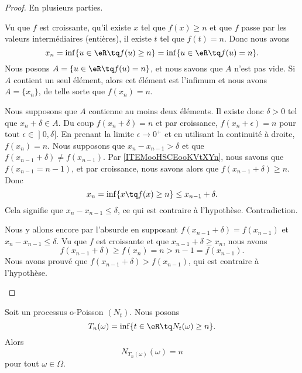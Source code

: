 \begin{proof}
	En plusieurs parties.
	\begin{subproof}
		\spitem[\( f(x_n)=n\)]
		Vu que \( f\) est croissante, qu'il existe \( x\) tel que \( f(x)\geq n\) et que \( f\) passe par les valeurs intermédiaires (entières), il existe \( t\) tel que \( f(t)=n\). Donc nous avons
		\begin{equation}
			x_n=\inf\{ u\in \eR\tq f(u)\geq n \}=\inf\{ u\in \eR\tq f(u)=n \}.
		\end{equation}
		Nous posons \( A=\{ u\in \eR\tq f(u)=n \}\), et nous savons que \( A\) n'est pas vide. Si \( A\) contient un seul élément, alors cet élément est l'infimum et nous avons \( A=\{ x_n \}\), de telle sorte que \( f(x_n)=n\).

		Nous supposons que \( A\) contienne au moins deux éléments. Il existe donc \( \delta>0\) tel que \( x_n+\delta\in A\). Du coup \( f(x_n+\delta)=n\) et par croissance, \( f(x_n+\epsilon)=n\) pour tout \( \epsilon\in \mathopen] 0,\delta\mathclose]\). En prenant la limite \( \epsilon\to 0^+\) et en utilisant la continuité à droite, \( f(x_n)=n\).
		\spitem[\( \Rightarrow\)]
		Nous supposons que \( x_n-x_{n-1}>\delta\) et que \( f(x_{n-1}+\delta)\neq f(x_{n-1})\). Par \ref{ITEMooHSCEooKVtXYn}, nous savons que \( f(x_{n-1}=n-1)\), et par croissance, nous savons alors que \( f(x_{n-1}+\delta)\geq n\). Donc
		\begin{equation}
			x_n=\inf\{ x\tq f(x)\geq n \}\leq x_{n-1}+\delta.
		\end{equation}
		Cela signifie que \( x_n-x_{n-1}\leq \delta\), ce qui est contraire à l'hypothèse. Contradiction.

		\spitem[\( \Leftarrow\)]
		Nous y allons encore par l'absurde en supposant \( f(x_{n-1}+\delta)=f(x_{n-1})\) et \( x_n-x_{n-1}\leq \delta\). Vu que \( f\) est croissante et que \( x_{n-1}+\delta\geq x_n\), nous avons
		\begin{equation}
			f(x_{n-1}+\delta)\geq f(x_n)=n>n-1=f(x_{n-1}).
		\end{equation}
		Nous avons prouvé que \( f(x_{n-1}+\delta)>f(x_{n-1})\), qui est contraire à l'hypothèse.
	\end{subproof}
\end{proof}


\begin{proposition}	\label{PROPooVLEEooLvCknn}
	Soit un processus o-Poisson \( (N_t)\). Nous posons
	\begin{equation}
		T_n(\omega)=\inf\{ t\in \eR\tq N_t(\omega)\geq n \}.
	\end{equation}
	Alors
	\begin{equation}
		N_{T_n(\omega)}(\omega)=n
	\end{equation}
	pour tout \( \omega\in \Omega\).
\end{proposition}

